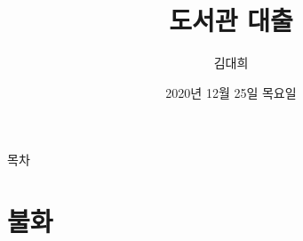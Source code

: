 \documentclass[aspectratio=1610,17pt,xcolor=pdftex,dvipsnames,table,handout]{beamer}
\begin{document}
	

			\title{ 도서관 대출 }
			\author{ 김대희 }
			\date{ 2020년 
					12월 						%
					25일 						%
					목요일   }					%


%
%
%
%

		\begin{frame}[plain]
		\titlepage
		\end{frame}


		\begin{frame} [plain]{목차}
		\tableofcontents
		\tableofcontents

		\end{frame}




		\begin{frame} [t,plain]
		\end{frame}			

		\begin{frame} [t,plain]
		\end{frame}			


		\part{ 불화 }
		\frame{\partpage}
\end{document}
